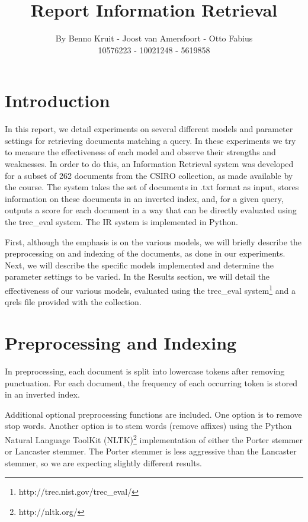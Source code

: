 \documentclass{article}
\begin{document}
\title{Report Information Retrieval}
\author{By Benno Kruit - Joost van Amersfoort - Otto Fabius \\ 10576223 - 10021248 - 5619858}
\maketitle

\section*{Introduction}
In this report, we detail experiments on several different models and parameter settings for retrieving documents matching a query. In these experiments we try to measure the effectiveness of each model and observe their strengths and weaknesses.  
In order to do this, an Information Retrieval system was developed for a subset of 262 documents from the CSIRO collection, as made available by the course. The system takes the set of documents in .txt format as input, stores information on these documents in an inverted index, and, for a given query, outputs a score for each document in a way that can be directly evaluated using the trec\_eval system. The IR system is implemented in Python.

First, although the emphasis is on the various models, we will briefly describe the preprocessing on and indexing of the documents, as done in our experiments. Next, we will describe the specific models implemented and determine the parameter settings to be varied. In the Results section, we will detail the effectiveness of our various models, evaluated using the trec\_eval system\footnote{http://trec.nist.gov/trec\_eval/} and a qrels file provided with the collection.

\section*{Preprocessing and Indexing}
In preprocessing, each document is split into lowercase tokens after removing punctuation. For each document, the frequency of each occurring token is stored in an inverted index. 

Additional optional preprocessing functions are included. One option is to remove stop words. Another option is to stem words (remove affixes) using the Python Natural Language ToolKit (NLTK)\footnote{http://nltk.org/} implementation of either the Porter stemmer or Lancaster stemmer. The Porter stemmer is less aggressive than the Lancaster stemmer, so we are expecting slightly different results.
\end{document}
